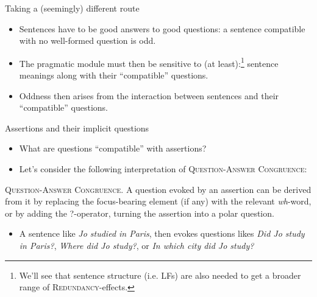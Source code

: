 \documentclass[10pt]{beamer}
\begin{document}
\begin{frame}{Taking a (seemingly) different route}
	\begin{itemize}
		\item Sentences have to be good answers to good questions: a sentence compatible with no well-formed question is odd.
		\item The pragmatic module must then be sensitive to (at least):\footnote{We'll see that sentence structure (i.e. LFs) are also needed to get a broader range of \textsc{Redundancy}-effects.} sentence meanings along with their ``compatible'' questions.
		\item Oddness then arises from the interaction between sentences and their ``compatible'' questions.
	\end{itemize}
	\begin{center}
	\end{center}
	
\end{frame}



\begin{frame}{Assertions and their implicit questions}
	\begin{itemize}
		\item What are questions ``compatible'' with assertions?
		\item Let's consider the following interpretation of \textsc{Question-Answer Congruence}:
	\end{itemize}
	\begin{exe}
		 {\textsc{Question-Answer Congruence. } A question evoked by an assertion can be derived from it by replacing the focus-bearing element (if any) with the relevant \textit{wh}-word, or by adding the ?-operator, turning the assertion into a polar question.}
	\end{exe}
	\begin{itemize}
		\item A sentence like \textit{Jo studied in Paris}, then evokes questions likes \textit{Did Jo study in Paris?}, \textit{Where did Jo study?}, or \textit{In which city did Jo study?}
	\end{itemize}
\end{frame}
\end{document}
